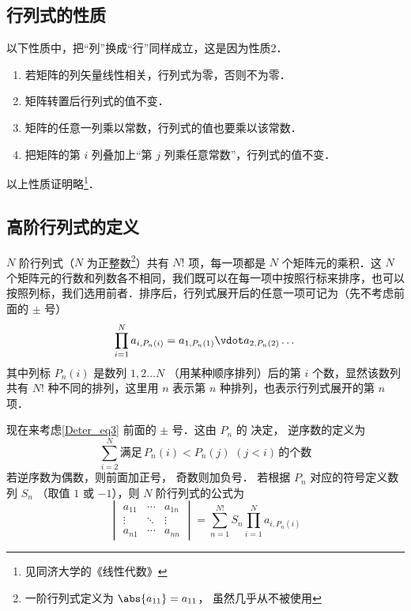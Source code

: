 \subsection{行列式的性质}
以下性质中，把“列”换成“行”同样成立，这是因为性质2．
\begin{enumerate}
\item 若矩阵的列矢量线性相关，行列式为零，否则不为零．
\item 矩阵转置后行列式的值不变． %
\item 矩阵的任意一列乘以常数，行列式的值也要乘以该常数．
\item 把矩阵的第 $i$ 列叠加上“第 $j$ 列乘任意常数”，行列式的值不变．

\end{enumerate}
以上性质证明略\footnote{见同济大学的《线性代数》}．

\subsection{高阶行列式的定义}
$N$ 阶行列式（$N$ 为正整数\footnote{一阶行列式定义为 $\abs{a_{11}}=a_{11}$， 虽然几乎从不被使用}）共有 $N!$ 项，每一项都是 $N$ 个矩阵元的乘积．这 $N$ 个矩阵元的行数和列数各不相同，我们既可以在每一项中按照行标来排序，也可以按照列标，我们选用前者．排序后，行列式展开后的任意一项可记为（先不考虑前面的 $\pm$ 号）
\begin{equation}\label{Deter_eq3}
\prod_{i=1}^N a_{i,P_n(i)} = 
a_{1,P_n(1)} \vdot a_{2,P_n(2)} \dots
\end{equation}
其中列标 ${P_n}(i)$ 是数列 $1,2 \dots N$ （用某种顺序排列）后的第 $i$ 个数，显然该数列共有 $N!$ 种不同的排列，这里用 $n$ 表示第 $n$ 种排列，也表示行列式展开的第 $n$ 项．

现在来考虑\autoref{Deter_eq3} 前面的 $\pm$ 号．这由 $P_n$ 的 决定， 逆序数的定义为
\begin{equation}
\sum_{i=2}^N \text{满足}\, P_n(i) < P_n(j) \,\, (j<i) \,\text{的个数} 
\end{equation}
若逆序数为偶数，则前面加正号， 奇数则加负号． 若根据 $P_n$ 对应的符号定义数列 $S_n$ （取值 $1$ 或 $-1$），则 $N$ 阶行列式的公式为
\begin{equation}
\begin{vmatrix}
a_{11} & \cdots & a_{1n} \\
\vdots & \ddots & \vdots \\
a_{n1} & \cdots & a_{nn}
\end{vmatrix}
= \sum_{n=1}^{N!} S_n \prod_{i=1}^N a_{i,P_n(i)}
\end{equation}


